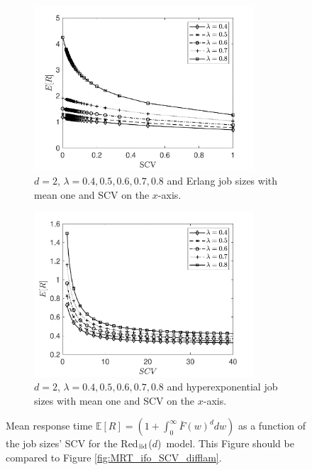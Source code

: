\documentclass[12pt]{report}
\newcommand{\Redind}{Red$_{\textup{iid}}$($d$)}
\newcommand{\E}{\mathbb{E}}
\begin{document}
\begin{figure}[t]
\begin{subfigure}{.45\textwidth}
\begin{center}
\includegraphics[width=0.9\textwidth]{figures/Chapter3/plot_MRT_Erlang_independent_difflam.pdf}
\caption{$d=2$, $\lambda=0.4,0.5,0.6,0.7,0.8$ and Erlang job sizes with mean one and SCV on the $x$-axis.}
\label{fig:MRT_ifo_SCV_difflam_Erlangs_ind}
\end{center}
\end{subfigure}
\begin{subfigure}{.45\textwidth}
\begin{center}
\includegraphics[width=0.9\textwidth]{figures/Chapter3/plot_ifo_SCV_HExp_varlam_ind.pdf}
\caption{$d=2$, $\lambda=0.4,0.5,0.6,0.7,0.8$ and hyperexponential job sizes with mean one and SCV on the $x$-axis.}
\label{fig:MRT_ifo_SCV_difflam_HExp_ind}
\end{center}
\end{subfigure}
\caption{Mean response time $\E[R] =\left(1+\int_0^\infty \bar{F}(w)^d dw\right)$ as a function of the job sizes' SCV for the \Redind\ model. This Figure should be compared to Figure \ref{fig:MRT_ifo_SCV_difflam}.}
\label{fig:MRT_ifo_SCV_difflam_ind}
\end{figure}
\end{document}
